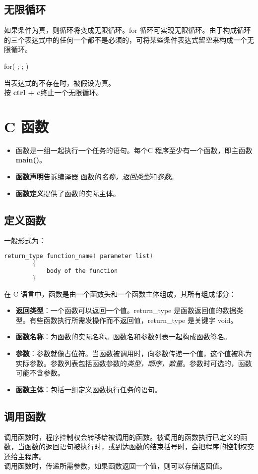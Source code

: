 \documentclass[UTF8]{ctexart}
\begin{document}
	\subsection{无限循环}
	如果条件为真，则循环将变成无限循环。for 循环可实现无限循环。由于构成循环的三个表达式中的任何一个都不是必须的，可将某些条件表达式留空来构成一个无限循环。
	\begin{framed}
		for( ; ; )
	\end{framed}
	当表达式的不存在时，被假设为真。\\按 \textbf{ctrl + c}终止一个无限循环。

	\clearpage
	\section{C 函数}
	\begin{itemize}
		\item 函数是一组一起执行一个任务的语句。每个C 程序至少有一个函数，即主函数\textbf{main()}。
		\item \textbf{函数声明}告诉编译器 函数的\textit{名称，返回类型}和\textit{参数}。
		\item \textbf{函数定义}提供了函数的实际主体。
	\end{itemize}
	\subsection{定义函数}
	一般形式为：
	\begin{lstlisting}[language=C]
		return_type function_name( parameter list)
		{
			body of the function
		}
	\end{lstlisting}
	在 C 语言中，函数是由一个函数头和一个函数主体组成，其所有组成部分：
	\begin{itemize}
		\item \textbf{返回类型}：一个函数可以返回一个值。return\_type 是函数返回值的数据类型。有些函数执行所需发操作而不返回值，return\_type 是关键字 void。
		\item \textbf{函数名称}：为函数的实际名称。函数名和参数列表一起构成函数签名。
		\item \textbf{参数}：参数就像占位符。当函数被调用时，向参数传递一个值，这个值被称为实际参数。参数列表包括函数参数的\textit{类型，顺序，数量}。参数时可选的，函数可能不含参数。
		\item \textbf{函数主体}：包括一组定义函数执行任务的语句。
	\end{itemize}
	\subsection{调用函数}
	调用函数时，程序控制权会转移给被调用的函数。被调用的函数执行已定义的函数，当函数的返回语句被执行时，或到达函数的结束括号时，会把程序的控制权交还给主程序。\\调用函数时，传递所需参数，如果函数返回一个值，则可以存储返回值。
\end{document}
